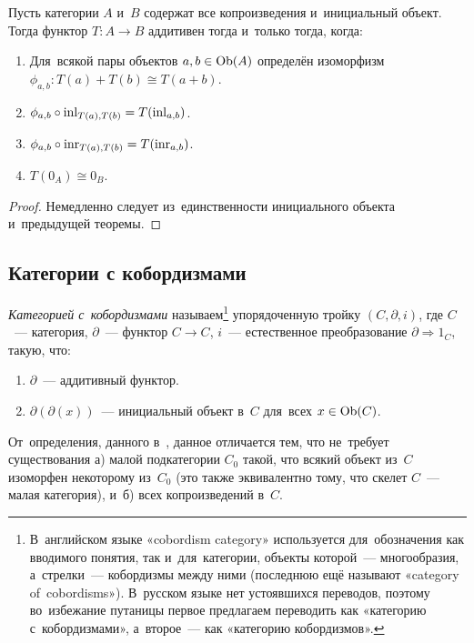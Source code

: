 \documentclass[a4paper,oneside]{article}
\newcommand{\notewrap}[1]{(#1)}
\begin{document}
\begin{theorem*}[\notewrap{критерий аддитивности}]
  Пусть категории $A$ и~$B$ содержат все копроизведения и~инициальный объект.
  Тогда функтор $T : A \rightarrow B$ аддитивен тогда и~только тогда, когда:
  \begin{enumerate}
    \item Для~всякой пары объектов $a, b \in \mathrm{Ob}(A)$ определён изоморфизм $\phi_{a, b} : T(a) + T(b) \cong T(a + b)$.
    \item $\phi_{a, b} \circ \mathrm{inl}_{T(a), T(b)} = T(\mathrm{inl}_{a, b})$.
    \item $\phi_{a, b} \circ \mathrm{inr}_{T(a), T(b)} = T(\mathrm{inr}_{a, b})$.
    \item $T(0_A) \cong 0_B$.
  \end{enumerate}
\end{theorem*}

\begin{proof}
  Немедленно следует из~единственности инициального объекта и~предыдущей теоремы.
\end{proof}

\subsection{Категории с кобордизмами}
\textit{Категорией с~кобордизмами} называем\footnote{
  В~английском языке «cobordism category» используется для~обозначения как вводимого понятия,
  так и~для~категории, объекты которой~— многообразия, а~стрелки~— кобордизмы между ними (последнюю
  ещё называют «category of~cobordisms»). В~русском языке нет устоявшихся переводов, поэтому
  во~избежание путаницы первое предлагаем переводить как «категорию с~кобордизмами», а~второе~—
  как «категорию кобордизмов».
} упорядоченную тройку $(C, \partial, i)$, где $C$~— категория, $\partial$~— функтор $C \rightarrow C$,
$i$~— естественное преобразование $\partial \Rightarrow 1_C$, такую, что:
\begin{enumerate}
  \item $\partial$~— аддитивный функтор.
  \item $\partial(\partial(x))$~— инициальный объект в~$C$ для~всех $x \in \mathrm{Ob}(C)$.
\end{enumerate}

От~определения, данного в~\cite{Stong68}, данное отличается тем, что не~требует существования а) малой подкатегории $C_0$
такой, что всякий объект из~$C$ изоморфен некоторому из~$C_0$ (это также эквивалентно тому, что скелет $C$~— малая категория),
и~б) всех копроизведений в~$C$.
\end{document}
